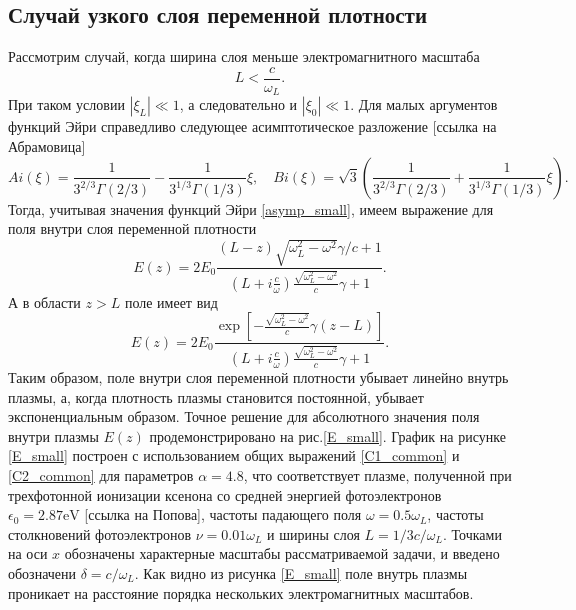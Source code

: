 \documentclass[12pt,a4paper]{article}
\numberwithin{equation}{section}
\begin{document}
\subsection{Случай узкого слоя переменной плотности}
 Рассмотрим случай, когда ширина слоя меньше электромагнитного масштаба
\begin{equation}
    \label{cond1}
    L<\frac{c}{\omega_L}.
\end{equation}
При таком условии $|\xi_L|\ll 1$, а следовательно и $|\xi_0|\ll 1$. Для малых аргументов функций Эйри справедливо следующее асимптотическое разложение [ссылка на Абрамовица]
\begin{equation}
    \label{asymp_small}
    Ai\left(\xi\right) = \frac{1}{3^{2/3}\Gamma\left(2/3\right)}-\frac{1}{3^{1/3}\Gamma\left(1/3\right)}\xi, \quad 
    Bi\left(\xi\right) = \sqrt{3}\left(\frac{1}{3^{2/3}\Gamma\left(2/3\right)}+\frac{1}{3^{1/3}\Gamma\left(1/3\right)}\xi\right).
\end{equation}
Тогда, учитывая значения функций Эйри  \eqref{asymp_small}, имеем выражение для поля внутри слоя переменной плотности 
\begin{equation}
    \label{E1_small}
     E\left(z\right)= 2E_0\frac{\left(L-z\right)\sqrt{\omega_L^2-\omega^2} \gamma/c+1}{\left(L+i\frac{c}{\omega}\right)\frac{\sqrt{\omega_L^2-\omega^2}}{c}\gamma+1}.
\end{equation}
А в области $z>L$ поле имеет вид
\begin{equation}
    \label{E2_small}
     E\left(z\right) = 2E_0   \frac{\exp\left[-\frac{\sqrt{\omega_L^2-\omega^2}}{c}\gamma\left(z-L\right)\right]}{\left(L+i\frac{c}{\omega}\right)\frac{\sqrt{\omega_L^2-\omega^2}}{c}\gamma+1}.
\end{equation}
Таким образом, поле внутри слоя переменной плотности убывает линейно внутрь плазмы, а, когда плотность плазмы становится постоянной, убывает экспоненциальным образом. Точное решение для абсолютного значения поля внутри плазмы $E\left(z\right)$ продемонстрировано на рис.\ref{E_small}. График на рисунке \ref{E_small} построен с использованием общих выражений \eqref{C1_common} и \eqref{C2_common} для параметров $\alpha = 4.8$, что соответствует плазме, полученной при трехфотонной ионизации ксенона со средней энергией фотоэлектронов $\epsilon_0=2.87\text{eV}$ [ссылка на Попова], частоты падающего поля $\omega = 0.5\omega_L$, частоты столкновений фотоэлектронов $\nu = 0.01 \omega_L$ и ширины слоя $L = 1/3 c/\omega_L$. Точками на оси $x$ обозначены характерные масштабы рассматриваемой задачи, и введено обозначени $\delta = c/\omega_L$. Как видно из рисунка \eqref{E_small} поле внутрь плазмы проникает на расстояние порядка нескольких электромагнитных масштабов.
\end{document}
